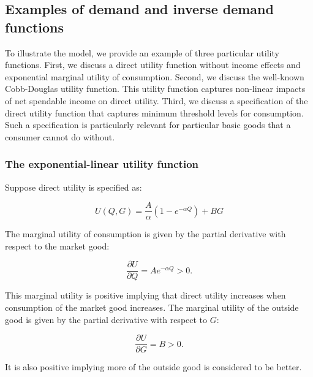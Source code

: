 \documentclass[
]{book}
\begin{document}
\hypertarget{examples-of-demand-and-inverse-demand-functions}{%
\subsection{Examples of demand and inverse demand functions}\label{examples-of-demand-and-inverse-demand-functions}}

To illustrate the model, we provide an example of three particular utility functions. First, we discuss a direct utility function without income effects and exponential marginal utility of consumption. Second, we discuss the well-known Cobb-Douglas utility function. This utility function captures non-linear impacts of net spendable income on direct utility. Third, we discuss a specification of the direct utility function that captures minimum threshold levels for consumption. Such a specification is particularly relevant for particular basic goods that a consumer cannot do without.

\hypertarget{the-exponential-linear-utility-function}{%
\subsubsection{The exponential-linear utility function}\label{the-exponential-linear-utility-function}}

Suppose direct utility is specified as:

\begin{equation}
U(Q,G) = \frac{A}{\alpha}\left( 1- e^{-\alpha Q} \right ) + BG
\label{eq:directutility}
\end{equation}

The marginal utility of consumption is given by the partial derivative with respect to the market good:

\begin{equation}
\frac{\partial U}{\partial Q} = Ae^{-\alpha Q} > 0.
\end{equation}

This marginal utility is positive implying that direct utility increases when consumption of the market good increases. The marginal utility of the outside good is given by the partial derivative with respect to \(G\):

\begin{equation}
\frac{\partial U}{\partial G} = B > 0.
\end{equation}

It is also positive implying more of the outside good is considered to be better.
\end{document}
